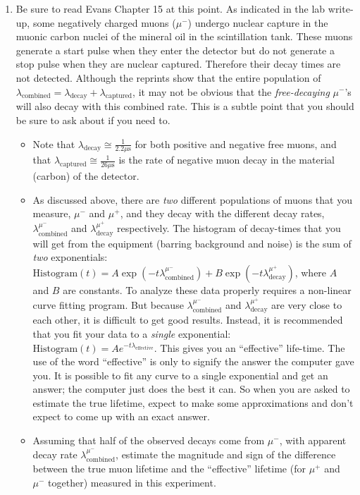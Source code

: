 \documentclass{../lab}
\begin{document}
\begin{enumerate}
    \item Be sure to read Evans Chapter 15 at this point. As indicated in the lab write-up, some negatively charged muons ($\mu^-$) undergo nuclear capture in the muonic carbon nuclei of the mineral oil in the scintillation tank. These muons generate a start pulse when they enter the detector but do not generate a stop pulse when they are nuclear captured. Therefore their decay times are not detected. Although the reprints show that the entire population of $\lambda_\text{combined} = \lambda_\text{decay} + \lambda_\text{captured}$, it may not be obvious that the \emph{free-decaying} $\mu^-$'s will also decay with this combined rate. This is a subtle point that you should be sure to ask about if you need to.

    \begin{itemize}
        \item Note that $ \lambda_\text{decay}\cong\frac{1}{2.2\mu\text{s}} $ for both positive and negative free muons, and that $ \lambda_\text{captured}\cong\frac{1}{26\mu\text{s}} $ is the rate of negative muon decay in the material (carbon) of the detector.

        \item As discussed above, there are \emph{two} different populations of muons that you measure, $\mu^-$ and $\mu^+$, and they decay with the different decay rates, $\lambda_\text{combined}^{\mu^-}$ and $\lambda_\text{decay}^{\mu^+}$ respectively. The histogram of decay-times that you will get from the equipment (barring background and noise) is the sum of \emph{two} exponentials: $\text{Histogram}(t) = A \exp(-t\lambda_\text{combined}^{\mu^-}) + B \exp(-t\lambda_\text{decay}^{\mu^+}) $, where $A$ and $B$ are constants. To analyze these data properly requires a non-linear curve fitting program. But because $\lambda_\text{combined}^{\mu^-}$ and $\lambda_\text{decay}^{\mu^+}$ are very close to each other, it is difficult to get good results. Instead, it is recommended that you fit your data to a \emph{single} exponential: $\text{Histogram}(t) = Ae^{-t\lambda_\text{effective}}$. This gives you an ``effective'' life-time. The use of the word ``effective'' is only to signify the answer the computer gave you. It is possible to fit any curve to a single exponential and get an answer; the computer just does the best it can. So when you are asked to estimate the true lifetime, expect to make some approximations and don't expect to come up with an exact answer.

        \item Assuming that half of the observed decays come from $\mu^-$, with apparent decay rate $\lambda_\text{combined}^{\mu^-}$, estimate the magnitude and sign of the difference between the true muon lifetime and the ``effective'' lifetime (for $\mu^+$ and $\mu^-$ together) measured in this experiment.


\end{itemize}
\end{enumerate}
\end{document}
